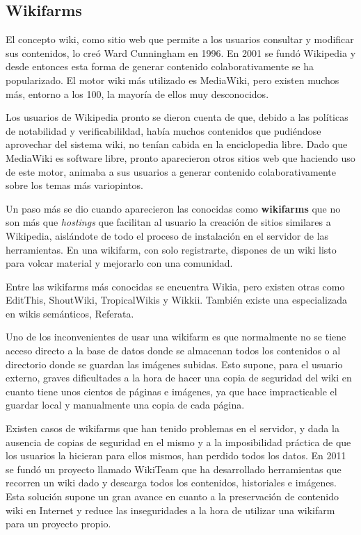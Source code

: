 \documentclass[11pt,onecolumn]{article}
\begin{document}


\subsection{Wikifarms}


El concepto wiki, como sitio web que permite a los usuarios consultar y modificar sus contenidos, lo creó Ward Cunningham en 1996. En 2001 se fundó Wikipedia y desde entonces esta forma de generar contenido colaborativamente se ha popularizado. El motor wiki más utilizado es MediaWiki, pero existen muchos más, entorno a los 100, la mayoría de ellos muy desconocidos.

Los usuarios de Wikipedia pronto se dieron cuenta de que, debido a las políticas de notabilidad y verificabilildad, había muchos contenidos que pudiéndose aprovechar del sistema wiki, no tenían cabida en la enciclopedia libre. Dado que MediaWiki es software libre, pronto aparecieron otros sitios web que haciendo uso de este motor, animaba a sus usuarios a generar contenido colaborativamente sobre los temas más variopintos.

Un paso más se dio cuando aparecieron las conocidas como \textbf{wikifarms} que no son más que \emph{hostings} que facilitan al usuario la creación de sitios similares a Wikipedia, aislándote de todo el proceso de instalación en el servidor de las herramientas. En una wikifarm, con solo registrarte, dispones de un wiki listo para volcar material y mejorarlo con una comunidad.

Entre las wikifarms más conocidas se encuentra Wikia, pero existen otras como EditThis, ShoutWiki, TropicalWikis y Wikkii. También existe una especializada en wikis semánticos, Referata.

Uno de los inconvenientes de usar una wikifarm es que normalmente no se tiene acceso directo a la base de datos donde se almacenan todos los contenidos o al directorio donde se guardan las imágenes subidas. Esto supone, para el usuario externo, graves dificultades a la hora de hacer una copia de seguridad del wiki en cuanto tiene unos cientos de páginas e imágenes, ya que hace impracticable el guardar local y manualmente una copia de cada página.

Existen casos de wikifarms que han tenido problemas en el servidor, y dada la ausencia de copias de seguridad en el mismo y a la imposibilidad práctica de que los usuarios la hicieran para ellos mismos, han perdido todos los datos. En 2011 se fundó un proyecto llamado WikiTeam que ha desarrollado herramientas que recorren un wiki dado y descarga todos los contenidos, historiales e imágenes. Esta solución supone un gran avance en cuanto a la preservación de contenido wiki en Internet y reduce las inseguridades a la hora de utilizar una wikifarm para un proyecto propio.
\end{document}
